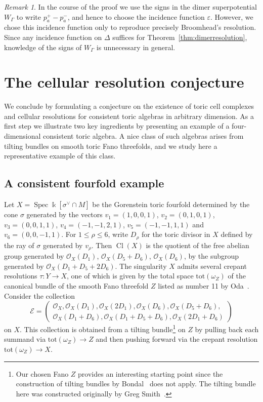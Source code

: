 \documentclass[11pt,a4paper]{amsart}
\numberwithin{equation}{section}
\theoremstyle{definition}
\theoremstyle{remark}
\newtheorem{remark}[theorem]{Remark}
\newcommand{\Cl}{\operatorname{Cl}}
\newcommand{\Spec}{\operatorname{Spec}}
\begin{document}
\begin{remark}
\label{rem:signsW_G}
In the course of the proof we use the signs in the dimer superpotential $W_\Gamma$ to write $p_a^+-p_a^-$, and hence to choose the incidence function $\varepsilon$. However, we chose this incidence function only to reproduce precisely Broomhead's resolution. Since any incidence function on $\Delta$ suffices for Theorem~\ref{thm:dimerresolution},  knowledge of the signs of $W_\Gamma$ is unnecessary in general.

\end{remark}

 \section{The cellular resolution conjecture}
 \label{sec:conjecture}
We conclude by formulating a conjecture on the existence of toric cell complexes and cellular resolutions for consistent toric algebras in arbitrary dimension. As a first step we illustrate two key ingredients by presenting an example of a four-dimensional consistent toric algebra.  A nice class of such algebras arises from tilting bundles on smooth toric Fano threefolds, and we study here a representative example of this class. 


\subsection{A consistent fourfold example}
\label{sec:conjectureexample}
 Let $X=\Spec \Bbbk[\sigma^{\vee}\cap M]$ be the Gorenstein toric fourfold determined by the cone $\sigma$ generated by the vectors $v_1=(1,0,0,1)$, $v_2=(0,1,0,1)$, $v_3=(0,0,1,1)$, $v_4=(-1,-1,2,1)$, $v_5=(-1,-1,1,1)$ and $v_6=(0,0,-1,1)$. For $1 \leq \rho \leq 6$,  write $D_\rho$ for the toric divisor in $X$ defined by the ray of $\sigma$ generated by $v_\rho$. Then $\Cl (X)$ is the quotient of the free abelian group generated by $\mathcal{O}_X(D_1)$, $\mathcal{O}_X(D_5+D_6)$, $\mathcal{O}_X(D_6)$, by the subgroup generated by $\mathcal{O}_X(D_1+D_5+2D_6)$. The singularity $X$ admits several crepant resolutions $\tau \colon Y \rightarrow X$, one of which is given by the total space $\mathrm{tot}(\omega_Z)$ of the canonical bundle of the smooth Fano threefold $Z$ listed as number 11 by Oda~\cite[Figure~2.7]{Oda}.  Consider the collection
$$
\mathscr{E}  = \left(\begin{array}{cc} \mathcal{O}_X, \mathcal{O}_X(D_1), \mathcal{O}_X(2D_1),\mathcal{O}_X(D_6),\mathcal{O}_X(D_5+D_6),\\
\mathcal{O}_X(D_1+D_6), \mathcal{O}_X(D_1+D_5+D_6),\mathcal{O}_X(2D_1+D_6) \end{array}\right)
$$
on $X$. This collection is obtained from a tilting bundle\footnote{Our chosen Fano $Z$ provides an interesting starting point since the construction of tilting bundles by Bondal~\cite{BondalMFO} does not apply. The tilting bundle here was constructed originally by Greg Smith~\cite[report by Craw]{BondalMFO}.} on $Z$ by pulling back each summand via $\mathrm{tot}(\omega_Z)\to Z$ and then pushing forward via the crepant resolution $\mathrm{tot}(\omega_Z)\to X$. 
\end{document}
